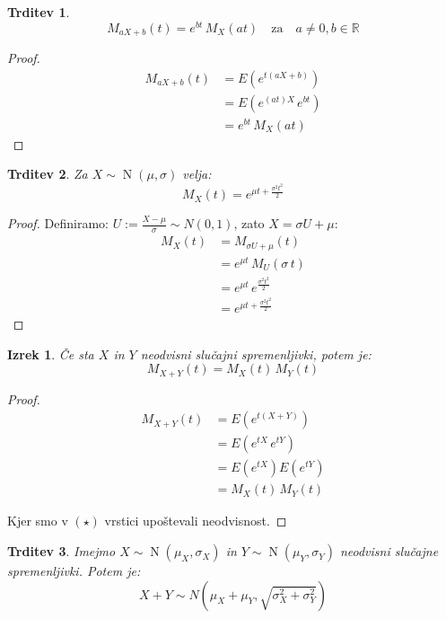 \documentclass[12pt]{book}
\theoremstyle{definition}
\theoremstyle{plain}
\newtheorem{izrek}{Izrek}
\theoremstyle{plain}
\newtheorem{trditev}{Trditev}
\theoremstyle{plain}
\theoremstyle{remark}
\begin{document}
\begin{trditev}
    $$
    M_{a X+b}(t)=e^{b t} \, M_X(a t) \quad \text{za} \quad a \neq 0, b \in \mathbb{R}
    $$
\end{trditev}

\begin{proof}
    $$
    \begin{aligned}
        M_{a X+b}(t)&=E\left(e^{t(a X+b)}\right) \\
        &=E\left(e^{(a t) X} \, e^{b t}\right) \\
        &=e^{b t} \, M_X(a t)
    \end{aligned}
    $$
\end{proof}

\begin{trditev}
    Za $X \sim \operatorname{N}(\mu, \sigma)$ velja: 
    $$
    M_X(t)=e^{\mu t+\frac{\sigma^2 t^2}{2}}
    $$
\end{trditev}

\begin{proof}
    Definiramo: $U:=\frac{X-\mu}{\sigma} \sim N(0,1)$, zato $X=\sigma U+\mu$:
    $$
    \begin{aligned}
        M_X(t)&=M_{\sigma U+\mu}(t) \\
        &=e^{\mu t} \, M_U(\sigma\, t) \\
        &=e^{\mu t} \, e^{\frac{\sigma^2 t^2}{2}} \\
        &=e^{\mu t+\frac{\sigma^2 t^2}{2}}
    \end{aligned}
    $$
\end{proof}

\begin{izrek}
    Če sta $X$ in $Y$ neodvisni slučajni spremenljivki, potem je:
    $$
    M_{X+Y}(t)=M_X(t) \, M_Y(t)
    $$
\end{izrek}

\begin{proof}
    \begin{align*}
        M_{X+Y}(t)&=E\left(e^{t (X+Y)}\right) \\
        &=E\left(e^{t X} \, e^{t  Y}\right) \tag{$\star$} \\
        &=E\left(e^{t X}\right) E\left(e^{tY}\right) \\
        &=M_X(t) \, M_Y(t)
    \end{align*}

    Kjer smo v $(\star)$ vrstici upoštevali neodvisnost.
\end{proof}

\begin{trditev}
    Imejmo $X \sim \operatorname{N}(\mu_X, \sigma_X)$ in $Y \sim \operatorname{N}(\mu_Y, \sigma_Y)$ neodvisni slučajne spremenljivki. Potem je: 
    $$
    X+Y \sim N\left(\mu_X+\mu_Y, \sqrt{\sigma_X^2+\sigma_Y^2}\right)
    $$
\end{trditev}
\end{document}
